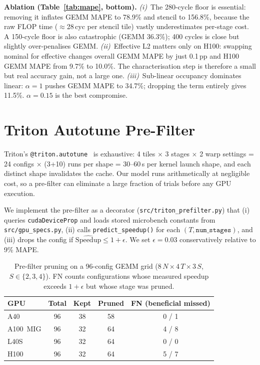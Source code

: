 \documentclass[10pt,twocolumn]{article}
\begin{document}
\textbf{Ablation (Table~\ref{tab:mape}, bottom).}
\emph{(i)}~The 280-cycle floor is essential: removing it inflates
GEMM MAPE to 78.9\% and stencil to 156.8\%, because the raw FLOP
time ($\approx$28\,cyc per stencil tile) vastly underestimates
per-stage cost.  A 150-cycle floor is also catastrophic (GEMM
36.3\%); 400 cycles is close but slightly over-penalises GEMM.
\emph{(ii)}~Effective L2 matters only on H100: swapping nominal for
effective changes overall GEMM MAPE by just 0.1\,pp and H100 GEMM
MAPE from 9.7\% to 10.0\%.  The characterisation step is therefore
a small but real accuracy gain, not a large one.
\emph{(iii)}~Sub-linear occupancy dominates linear: $\alpha{=}1$
pushes GEMM MAPE to 34.7\%; dropping the term entirely gives
11.5\%.  $\alpha{=}0.15$ is the best compromise.

\section{Triton Autotune Pre-Filter}
\label{sec:triton}

Triton's \texttt{@triton.autotune}~\cite{triton} is exhaustive:
4 tiles $\times$ 3 stages $\times$ 2 warp settings = 24 configs
$\times$ (3+10) runs per shape = 30--60\,s per kernel launch shape,
and each distinct shape invalidates the cache.  Our model runs
arithmetically at negligible cost, so a pre-filter can eliminate a
large fraction of trials before any GPU execution.

We implement the pre-filter as a decorator
(\texttt{src/triton\_prefilter.py}) that (i) queries
\texttt{cudaDeviceProp} and loads stored microbench constants from
\texttt{src/gpu\_specs.py}, (ii) calls \texttt{predict\_speedup()}
for each $(T, \texttt{num\_stages})$, and (iii) drops the config if
$\widehat{\text{Speedup}} \leq 1 + \epsilon$.  We set
$\epsilon{=}0.03$ conservatively relative to 9\% MAPE.

\begin{table}[h]
\centering
\footnotesize
\caption{Pre-filter pruning on a 96-config GEMM grid
($8\,N \times 4\,T \times 3\,S$, $S \in \{2,3,4\}$).  FN counts
configurations whose measured speedup exceeds $1{+}\epsilon$ but
whose stage was pruned.}
\label{tab:prefilter}
\renewcommand{\arraystretch}{1.1}
\begin{tabular}{@{}lcccc@{}}
\toprule
GPU & Total & Kept & Pruned & FN (beneficial missed) \\
\midrule
A40       & 96 & 38 & 58 & 0 / 1 \\
A100~MIG  & 96 & 32 & 64 & 4 / 8 \\
L40S      & 96 & 32 & 64 & 0 / 0 \\
H100      & 96 & 32 & 64 & 5 / 7 \\
\bottomrule
\end{tabular}
\end{table}
\end{document}
